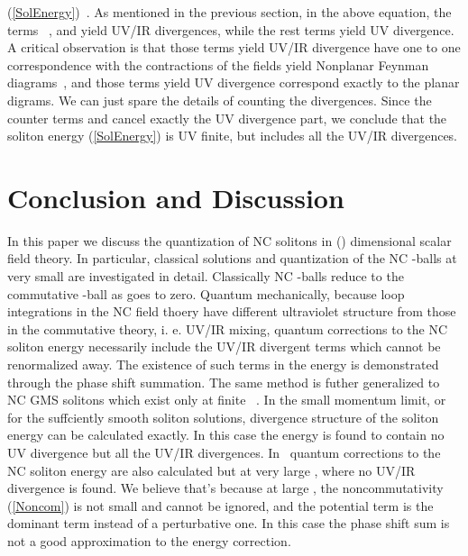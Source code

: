 \documentclass[a4paper,a4paper]{article}
\begin{document}
(\ref{SolEnergy})\ . As mentioned in the previous section, in the above equation, 
the terms \coordHE{}\ , \coordHE{} and 
\coordHE{} yield UV/IR divergences, while the rest terms yield UV 
divergence. A critical observation is that those terms yield UV/IR divergence 
have one to one correspondence with the contractions of the fields yield Nonplanar 
Feynman diagrams~\cite{MRS}, and those terms yield UV divergence correspond exactly 
to the planar digrams. We can just spare the details of counting the divergences. 
Since the counter terms \coordHE{} and \coordHE{} cancel exactly the 
UV divergence part, we conclude that the soliton energy (\ref{SolEnergy}) is    
UV finite, but includes all the UV/IR divergences. 

\section{Conclusion and Discussion}

In this paper we discuss the quantization of NC solitons in (\coordHE{}) dimensional 
scalar field theory. In particular, classical solutions and quantization of the 
NC \coordHE{}-balls at very small \myHighlight{$\theta$}\coordHE{} are investigated in detail. Classically 
NC \coordHE{}-balls reduce to the commutative \coordHE{}-ball as \myHighlight{$\theta$}\coordHE{} goes to zero. 
Quantum mechanically, because loop integrations in the NC field thoery have different 
ultraviolet structure from those in the commutative theory, i. e. UV/IR mixing, 
quantum corrections to the NC soliton energy necessarily include the UV/IR 
divergent terms which cannot be renormalized away. The existence of such terms 
in the energy is demonstrated through the phase shift summation. The same method 
is futher generalized to NC GMS solitons which exist only at finite \myHighlight{$\theta$}\coordHE{}\ . 
In the small momentum limit, or for the suffciently smooth soliton solutions, 
divergence structure of the soliton energy can be calculated exactly. In this case the 
energy is found to contain no UV divergence but all the UV/IR divergences. 
In~\cite{Miao} quantum corrections to the NC soliton energy are also calculated but 
at very large \myHighlight{$\theta$}\coordHE{}, where no UV/IR divergence is found. We believe that's 
because at large \myHighlight{$\theta$}\coordHE{}, the noncommutativity (\ref{Noncom}) is not small and 
cannot be ignored, and the potential term is the dominant term instead of a perturbative 
one. In this case the phase shift sum is not a good approximation to the energy 
correction. 
\end{document}
